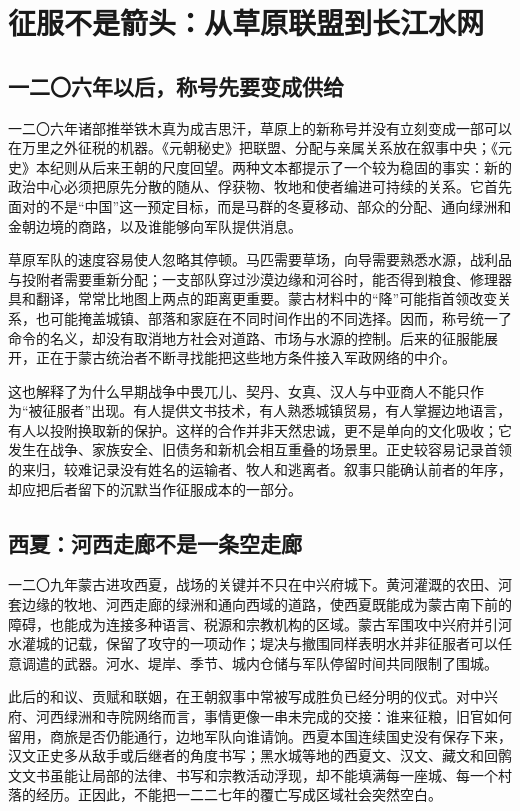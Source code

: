 \section{征服不是箭头：从草原联盟到长江水网}

\subsection{一二〇六年以后，称号先要变成供给}

一二〇六年诸部推举铁木真为成吉思汗，草原上的新称号并没有立刻变成一部可以在万里之外征税的机器。《元朝秘史》把联盟、分配与亲属关系放在叙事中央；《元史》本纪则从后来王朝的尺度回望。两种文本都提示了一个较为稳固的事实：新的政治中心必须把原先分散的随从、俘获物、牧地和使者编进可持续的关系。它首先面对的不是“中国”这一预定目标，而是马群的冬夏移动、部众的分配、通向绿洲和金朝边境的商路，以及谁能够向军队提供消息。

草原军队的速度容易使人忽略其停顿。马匹需要草场，向导需要熟悉水源，战利品与投附者需要重新分配；一支部队穿过沙漠边缘和河谷时，能否得到粮食、修理器具和翻译，常常比地图上两点的距离更重要。蒙古材料中的“降”可能指首领改变关系，也可能掩盖城镇、部落和家庭在不同时间作出的不同选择。因而，称号统一了命令的名义，却没有取消地方社会对道路、市场与水源的控制。后来的征服能展开，正在于蒙古统治者不断寻找能把这些地方条件接入军政网络的中介。

这也解释了为什么早期战争中畏兀儿、契丹、女真、汉人与中亚商人不能只作为“被征服者”出现。有人提供文书技术，有人熟悉城镇贸易，有人掌握边地语言，有人以投附换取新的保护。这样的合作并非天然忠诚，更不是单向的文化吸收；它发生在战争、家族安全、旧债务和新机会相互重叠的场景里。正史较容易记录首领的来归，较难记录没有姓名的运输者、牧人和逃离者。叙事只能确认前者的年序，却应把后者留下的沉默当作征服成本的一部分。

\subsection{西夏：河西走廊不是一条空走廊}

一二〇九年蒙古进攻西夏，战场的关键并不只在中兴府城下。黄河灌溉的农田、河套边缘的牧地、河西走廊的绿洲和通向西域的道路，使西夏既能成为蒙古南下前的障碍，也能成为连接多种语言、税源和宗教机构的区域。蒙古军围攻中兴府并引河水灌城的记载，保留了攻守的一项动作；堤决与撤围同样表明水并非征服者可以任意调遣的武器。河水、堤岸、季节、城内仓储与军队停留时间共同限制了围城。

此后的和议、贡赋和联姻，在王朝叙事中常被写成胜负已经分明的仪式。对中兴府、河西绿洲和寺院网络而言，事情更像一串未完成的交接：谁来征粮，旧官如何留用，商旅是否仍能通行，边地军队向谁请饷。西夏本国连续国史没有保存下来，汉文正史多从敌手或后继者的角度书写；黑水城等地的西夏文、汉文、藏文和回鹘文文书虽能让局部的法律、书写和宗教活动浮现，却不能填满每一座城、每一个村落的经历。正因此，不能把一二二七年的覆亡写成区域社会突然空白。

